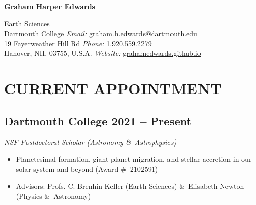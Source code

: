 \documentclass[10pt]{article}
\begin{document}

\begingroup
\centering \LARGE \textbf{\underline{Graham Harper Edwards}} \\ [1em]
\endgroup



Earth Sciences \\
Dartmouth College \hfill \textit{Email:} graham.h.edwards@dartmouth.edu \\
19 Fayerweather Hill Rd \hfill \textit{Phone:} 1.920.559.2279 \\
Hanover, NH, 03755, U.S.A.	\hfill \textit{Website:} \href{https://grahamedwards.github.io}{grahamedwards.github.io}

\vspace{2ex}
\iffalse
\section{STATEMENT}

\textbf{Research} \ I am a geochemist and geochronologist: my primary research interest is to resolve and refine timescales of Earth and solar system processes via radiometric records. My doctoral research has focused on the application of the uranium decay systems to uncover the tempos of high-temperature processes in deep time and subglacial processes in the Quaternary. In my future work, I am excited to hone my statistical techniques to apply to database studies of meteorite chemistries.

In addition to my research interests, I am dually committed to the inclusion, support, and retention of individuals and groups of diverse identities and backgrounds.
\fi



\section*{CURRENT APPOINTMENT}
\subsection*{\textbf{Dartmouth College} \hfill 2021 – Present}
\textit{NSF Postdoctoral Scholar (Astronomy \&\ Astrophysics)}
\begin{itemize}
	\item[] Planetesimal formation, giant planet migration, and stellar accretion in our solar system and beyond (Award \#\ 2102591)
	\item[] Advisors: Profs. C. Brenhin Keller (Earth Sciences) \&\ Elisabeth Newton (Physics \&\ Astronomy)
\end{itemize}
	
\end{document}
